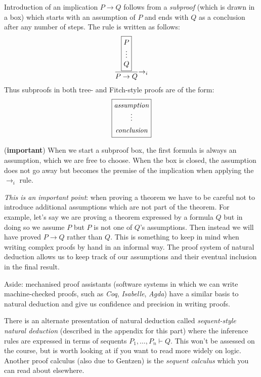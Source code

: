 Introduction of an implication $P \rightarrow Q$ follows from a
\emph{subproof} (which is drawn in a box) which starts with an
assumption of $P$ and ends with $Q$ as a conclusion after any number
of steps. The rule is written as follows:
%
\begin{align*}
\setlength{\arraycolsep}{0em}
\dfrac{\fbox{$\begin{array}{c} P \\ \vdots \\ Q\end{array}$}}
      {P \rightarrow Q} {\rightarrow_i}
\end{align*}
%
Thus subproofs in both tree- and Fitch-style proofs
are of the form:
%
\begin{equation*}
\setlength{\arraycolsep}{0em}
\fbox{$\begin{array}{c} \textit{assumption} \\ \vdots \\[0.5em]
         \textit{conclusion} \end{array}$}
\end{equation*}
%
\begin{remark} (\textbf{important})
%
  When we start a subproof box, the first formula is always an
  assumption, which we are free to choose. When the box is closed, the assumption does not go away
  but becomes the premise of the implication when applying the
  $\rightarrow_i$ rule.

  \emph{This is an important point}: when proving a theorem we
  have to be careful not to introduce additional assumptions which are
  not part of the theorem. For example, let's say we are proving a
  theorem expressed by a formula $Q$ but in doing so we assume $P$
  but $P$ is not one of $Q$'s assumptions.  Then
  instead we will have proved $P \rightarrow Q$ rather than $Q$.  This
  is something to keep in mind when writing complex
  proofs by hand in an informal way. The proof system of natural deduction allows us to keep
  track of our assumptions and their eventual inclusion in the final
  result.

  Aside: mechanised proof assistants (software systems in which we
  can write machine-checked proofs, such as \emph{Coq},
  \emph{Isabelle}, \emph{Agda}) have a similar basis to
  natural deduction and give us confidence and precision in writing proofs.
\end{remark}
%
There is an alternate presentation of natural deduction called
\emph{sequent-style natural deduction} (described in the
appendix for this part) where the inference rules are expressed in
terms of sequents $P_1, \ldots, P_n \vdash Q$. This won't be assessed
on the course, but is worth looking at if you want to read more widely
on logic. Another proof calculus (also due to Gentzen) is the
\emph{sequent calculus} which you can read about elsewhere.

